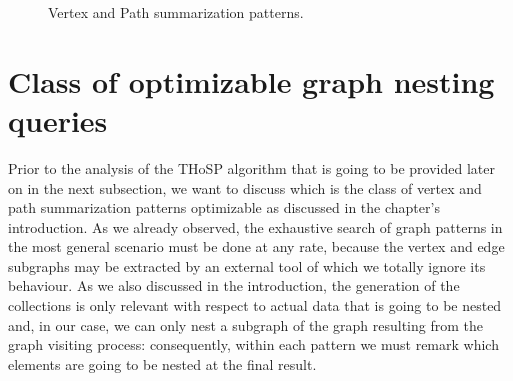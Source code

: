 \begin{figure}[!b]
\begin{minipage}[!t]{0.45\textwidth}
		\label{fig:edgewithIntersectionNonSRC}
	\end{minipage}%
	\caption{Vertex  and Path  summarization patterns.}
	\label{fig:patternAnalysis}
\end{figure}
\vfill\eject

\section{Class of optimizable graph nesting queries}\label{sec:optimizableClass}
Prior to the analysis of the THoSP algorithm that is going to be provided later on in the next subsection, we want to discuss which is the class of vertex and path summarization patterns optimizable as discussed in the chapter's introduction. As we already observed, %
the exhaustive search of graph patterns in the most general scenario must be done at any rate, because the vertex and  edge subgraphs may be extracted by an external tool of which we totally ignore its behaviour. As we also discussed in the introduction, the generation of the collections is only relevant with respect to actual data that is going to be nested and, in our case, we can only nest a subgraph of the graph resulting from the graph visiting process: consequently, within each pattern we must remark which elements are going to be nested at the final result.

